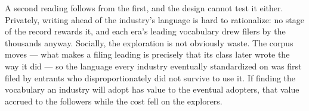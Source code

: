 A second reading follows from the first, and the design cannot test it
either. Privately, writing ahead of the industry's language is hard to
rationalize: no stage of the record rewards it, and each era's leading
vocabulary drew filers by the thousands anyway. Socially, the
exploration is not obviously waste. The corpus moves --- what makes a
filing leading is precisely that its class later wrote the way it did
--- so the language every industry eventually standardized on was first
filed by entrants who disproportionately did not survive to use it. If
finding the vocabulary an industry will adopt has value to the eventual
adopters, that value accrued to the followers while the cost fell on the
explorers.


